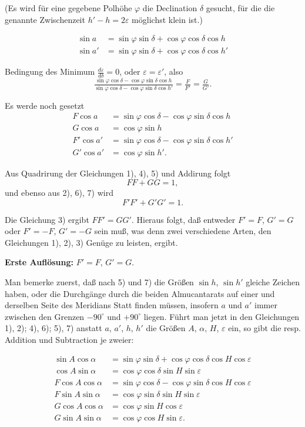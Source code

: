 \documentclass[12pt,a4paper]{article}
\theoremstyle{plain}
\theoremstyle{definition}
\theoremstyle{remark}
\begin{document}
(Es wird f\"ur eine gegebene Polh\"ohe $\varphi$ die Declination $\delta$ gesucht, f\"ur die die genannte Zwischenzeit $h' - h = 2\varepsilon$ m\"oglichst klein ist.)

\begin{align}
\sin a &= \sin\varphi \sin\delta + \cos\varphi \cos\delta \cos h \\
\sin a' &= \sin\varphi \sin\delta + \cos\varphi \cos\delta \cos h'
\end{align}

Bedingung des Minimum $\tfrac{d\varepsilon}{d\delta} = 0$, oder $\varepsilon = \varepsilon'$, also
\begin{equation}
\tfrac{\sin\varphi \cos\delta - \cos\varphi \sin\delta \cos h}{\sin\varphi \cos\delta - \cos\varphi \sin\delta \cos h'} = \tfrac{F}{F'} = \tfrac{G}{G'}.
\end{equation}

Es werde noch gesetzt
\begin{align}
F\cos a &= \sin\varphi \cos\delta - \cos\varphi \sin\delta \cos h \\
G\cos a &= \cos\varphi \sin h \\
F'\cos a' &= \sin\varphi \cos\delta - \cos\varphi \sin\delta \cos h' \\
G'\cos a' &= \cos\varphi \sin h'.
\end{align}

Aus Quadrirung der Gleichungen 1), 4), 5) und Addirung folgt
\[
FF + GG = 1,
\]
und ebenso aus 2), 6), 7) wird
\[
F'F' + G'G' = 1.
\]

Die Gleichung 3) ergibt $FF' = GG'$. Hieraus folgt, da\ss{} entweder $F' = F$, $G' = G$ oder $F' = -F$, $G' = -G$ sein mu\ss, was denn zwei verschiedene Arten, den Gleichungen 1), 2), 3) Gen\"uge zu leisten, ergibt.

\textbf{Erste Aufl\"osung:} $F' = F$, $G' = G$.

Man bemerke zuerst, da\ss{} nach 5) und 7) die Gr\"o\ss en $\sin h$, $\sin h'$ gleiche Zeichen haben, oder die Durchg\"ange durch die beiden Almucantarats auf einer und derselben Seite des Meridians Statt finden m\"ussen, insofern $a$ und $a'$ immer zwischen den Grenzen $-90^{\circ}$ und $+90^{\circ}$ liegen. F\"uhrt man jetzt in den Gleichungen 1), 2); 4), 6); 5), 7) anstatt $a$, $a'$, $h$, $h'$ die Gr\"o\ss en $A$, $\alpha$, $H$, $\varepsilon$ ein, so gibt die resp. Addition und Subtraction je zweier:

\begin{align}
\sin A \cos\alpha &= \sin\varphi \sin\delta + \cos\varphi \cos\delta \cos H \cos\varepsilon \\
\cos A \sin\alpha &= \cos\varphi \cos\delta \sin H \sin\varepsilon \\
F\cos A \cos\alpha &= \sin\varphi \cos\delta - \cos\varphi \sin\delta \cos H \cos\varepsilon \\
F\sin A \sin\alpha &= \cos\varphi \sin\delta \sin H \sin\varepsilon \\
G\cos A \cos\alpha &= \cos\varphi \sin H \cos\varepsilon \\
G\sin A \sin\alpha &= \cos\varphi \cos H \sin\varepsilon.
\end{align}
\end{document}
